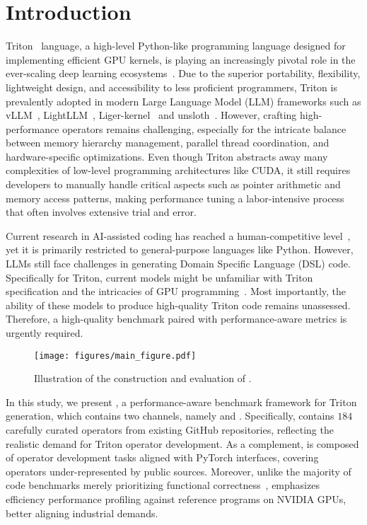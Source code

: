 \section{Introduction}
%
Triton~\cite{tillet2019triton} language, a high-level Python-like programming language designed for implementing efficient GPU kernels, is playing an increasingly pivotal role in the ever-scaling deep learning ecosystems~\cite{abadi2016tensorflow,paszke2019pytorch}. 
Due to the superior portability, flexibility, lightweight design, and accessibility to less proficient programmers, Triton is prevalently adopted in modern Large Language Model (LLM) frameworks such as vLLM~\cite{vllm}, LightLLM~\cite{lightllm}, Liger-kernel~\cite{liger} and unsloth~\cite{unsloth}. 
However, crafting high-performance operators remains challenging, especially for the intricate balance between memory hierarchy management, parallel thread coordination, and hardware-specific optimizations. 
Even though Triton abstracts away many complexities of low-level programming architectures like CUDA, it still requires developers to manually handle critical aspects such as pointer arithmetic and memory access patterns, making performance tuning a labor-intensive process that often involves extensive trial and error. 


Current research in AI-assisted coding has reached a human-competitive level~\cite{hui2024qwen2,zhu2024deepseek}, yet it is primarily restricted to general-purpose languages like Python. 
However, LLMs still face challenges in generating Domain Specific Language (DSL) code. 
Specifically for Triton, current models might be unfamiliar with Triton specification and the intricacies of GPU programming~\cite{nichols2024can}. 
Most importantly, the ability of these models to produce high-quality Triton code remains unassessed. 
Therefore, a high-quality benchmark paired with performance-aware metrics is urgently required.


\begin{figure*}[t]
\vspace{-5mm}
    \centering
    \texttt{[image: figures/main\_figure.pdf]}
    \caption{Illustration of the construction and evaluation of \benchall.}
    \label{fig:main_figure}
\end{figure*}


In this study, we present \benchall, a performance-aware benchmark framework for Triton generation, which contains two channels, namely \benchone and \benchtwo. 
Specifically, \benchone contains $184$ carefully curated operators from existing GitHub repositories, reflecting the realistic demand for Triton operator development. 
As a complement, \benchtwo is composed of operator development tasks aligned with PyTorch interfaces, covering operators under-represented by public sources.
Moreover, unlike the majority of code benchmarks merely prioritizing functional correctness~\cite{chen2021evaluating,austin2021program}, \benchall emphasizes efficiency performance profiling against reference programs on NVIDIA GPUs, better aligning industrial demands. 

